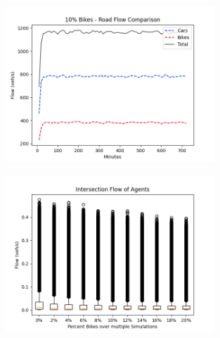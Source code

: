 \documentclass[compress,aspectratio=169]{beamer}
\begin{document}
\begin{frame}
\vspace{-0.2cm}
        \begin{figure}
		\includegraphics[width=0.7\textwidth]{Images/road_flow_comparison.png}
	\end{figure}
\end{frame}

\begin{frame}
\vspace{-0.2cm}
        \begin{figure}
		\includegraphics[width=0.7\textwidth]{Images/intersection_flow_agent(Fliers).png}
	\end{figure}
\end{frame}







	
\end{document}
